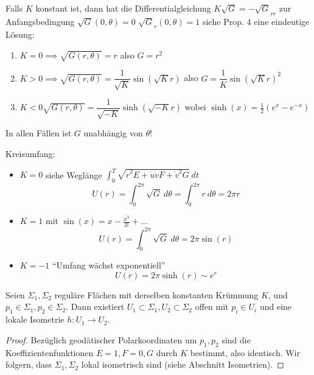 \documentclass[../main.tex]{subfiles}
\begin{document}
\begin{geometric}


\end{geometric}
\begin{application}
Falls $K$ konstant ist, dann hat die Differentialgleichung 
$ K \sqrt{G}= - \sqrt{G}_{rr}$ zur Anfangsbedingung $\sqrt{G}(0,\theta)=0$
$\sqrt{G}_r(0,\theta)=1$ siehe Prop. 4 eine eindeutige Lösung:
\leavevmode
\begin{enumerate}
    \item $K=0 \implies \sqrt{G(r,\theta)}=r$ also $G=r^2$
    \item $K > 0 \implies \sqrt{G(r,\theta)}= \dfrac{1}{\sqrt{K}}\sin (\sqrt{K}r)$ also $G=\dfrac{1}{K}\sin (\sqrt{K}r)^2$
    \item $K < 0 \sqrt{G(r, \theta)}=\dfrac{1}{\sqrt{-K}} \sinh (\sqrt{-K}r)$ wobei $\sinh (x)=\frac{1}{2}(e^x - e^{-x})$
\end{enumerate}  
In allen Fällen ist $G$ unabhängig von $\theta$!
\end{application}

Kreisumfang:
\begin{itemize}
    \item $K=0$ siehe Weglänge $\int_0^T \sqrt{\dot{r}^{2}E + \dot{u}\dot{v}F + \dot{v}^2 G} \ dt $\\
    $$U(r)= \int_0^{2\pi} \sqrt{G} \ d\theta = \int_0 ^{2\pi} r \ d\theta = 2\pi r$$
    \item $K=1$ mit $\sin(x)=x-\frac{x^3}{3!} + \dots$ \\
    $$U(r) = \int_0^{2\pi} \sqrt{G} \ d\theta = 2 \pi \sin(r)$$
    \item $K=-1$ ``Umfang wächst exponentiell''\\
    $$U(r)=2\pi \sinh (r) \sim e^r$$
\end{itemize}

\begin{theorem}[Minding 1839]
    Seien $\Sigma_1, \Sigma_2$ reguläre Flächen mit derselben konstanten Krümmung $K$, und $p_1 \in \Sigma_1,p_2 \in \Sigma_2$.
    Dann existiert $U_1 \subset \Sigma_1, U_2 \subset \Sigma_2$ offen mit $p_i \in U_i$ und eine lokale Isometrie $h : U_1 \to U_2$.
\end{theorem}

\begin{proof}
    Bezüglich geodätischer Polarkoordinaten um $p_1, p_2$ sind die Koeffizientenfunktionen $E=1, F=0, G$ durch $K$ bestimmt, also identisch.
    Wir folgern, dass $\Sigma_1, \Sigma_2$ lokal isometrisch sind (siehe Abschnitt Isometrien).
\end{proof}
\end{document}
